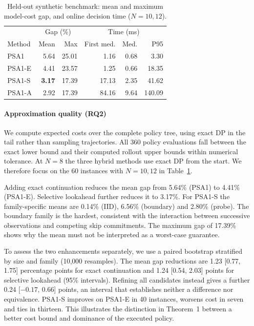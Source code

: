 \documentclass[conference]{IEEEtran}
\begin{document}
\begin{table}[t]
\caption{Held-out synthetic benchmark: mean and maximum model-cost gap, and online decision time ($N=10,12$).}
\label{tab:quality}
\centering
\begin{tabular}{lrrrrr}\hline
 & \multicolumn{2}{c}{Gap (\%)} & \multicolumn{3}{c}{Time (ms)}\\
 Method & Mean & Max & First med. & Med. & P95\\\hline
 PSA1 & 5.64 & 25.01 & 1.16 & 0.68 & 3.30\\
 PSA1-E & 4.41 & 23.57 & 1.25 & 0.66 & 18.35\\
 PSA1-S & \textbf{3.17} & 17.39 & 17.13 & 2.35 & 41.62\\
 PSA1-A & 2.92 & 17.39 & 84.16 & 9.64 & 140.09\\\hline
\end{tabular}
\end{table}
\paragraph{Approximation quality (RQ2)}
We compute expected costs over the complete policy tree, using exact DP in the tail rather than sampling trajectories. All 360 policy evaluations fall between the exact lower bound and their computed rollout upper bounds within numerical tolerance. At $N=8$ the three hybrid methods use exact DP from the start. We therefore focus on the 60 instances with $N=10,12$ in Table~\ref{tab:quality}.

Adding exact continuation reduces the mean gap from 5.64\% (PSA1) to 4.41\% (PSA1-E). Selective lookahead further reduces it to 3.17\%. For PSA1-S the family-specific means are 0.14\% (IID), 6.56\% (boundary) and 2.80\% (probe). The boundary family is the hardest, consistent with the interaction between successive observations and competing skip commitments. The maximum gap of 17.39\% shows why the mean must not be interpreted as a worst-case guarantee.

To assess the two enhancements separately, we use a paired bootstrap stratified by size and family (10,000 resamples). The mean gap reductions are 1.23 [0.77, 1.75] percentage points for exact continuation and 1.24 [0.54, 2.03] points for selective lookahead (95\% intervals). Refining all candidates instead gives a further 0.24 [$-0.17$, 0.66] points, an interval that establishes neither a difference nor equivalence. PSA1-S improves on PSA1-E in 40 instances, worsens cost in seven and ties in thirteen. This illustrates the distinction in Theorem~1 between a better cost bound and dominance of the executed policy.
\end{document}
